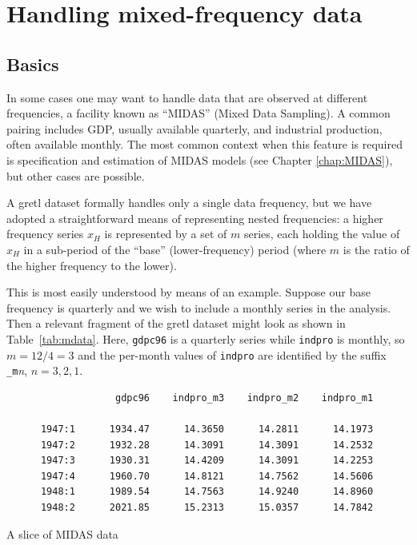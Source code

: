 \chapter{Handling mixed-frequency data}
\label{chap:mixed-frequency}

\section{Basics}
\label{sec:mixed-basics}

In some cases one may want to handle data that are observed at
different frequencies, a facility known as ``MIDAS'' (Mixed Data
Sampling). A common pairing includes GDP, usually available quarterly,
and industrial production, often available monthly. The most common
context when this feature is required is specification and estimation
of MIDAS models (see Chapter \ref{chap:MIDAS}), but other cases are
possible.

A gretl dataset formally handles only a single data frequency, but we
have adopted a straightforward means of representing nested
frequencies: a higher frequency series $x_H$ is represented by a set
of $m$ series, each holding the value of $x_H$ in a sub-period of the
``base'' (lower-frequency) period (where $m$ is the ratio of the
higher frequency to the lower).

This is most easily understood by means of an example. Suppose our
base frequency is quarterly and we wish to include a monthly series in
the analysis. Then a relevant fragment of the gretl dataset might look
as shown in Table~\ref{tab:mdata}. Here, \texttt{gdpc96} is a
quarterly series while \texttt{indpro} is monthly, so $m=12/4=3$ and
the per-month values of \texttt{indpro} are identified by the suffix
\verb|_m|\textit{n}, $n=3,2,1$.

\begin{table}[h]
\small
\begin{verbatim}
                   gdpc96    indpro_m3    indpro_m2    indpro_m1

      1947:1      1934.47      14.3650      14.2811      14.1973
      1947:2      1932.28      14.3091      14.3091      14.2532
      1947:3      1930.31      14.4209      14.3091      14.2253
      1947:4      1960.70      14.8121      14.7562      14.5606
      1948:1      1989.54      14.7563      14.9240      14.8960
      1948:2      2021.85      15.2313      15.0357      14.7842
\end{verbatim}
  \caption{A slice of MIDAS data}
  \label{tab:mdata}
\end{table}

